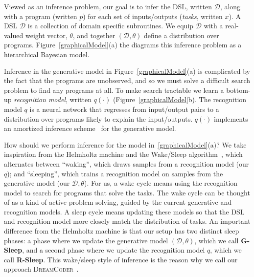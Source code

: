 \documentclass{article}
\newcommand{\system}{\textsc{DreamCoder}~}
\begin{document}
Viewed as an inference problem,
our goal is to infer the DSL, written $\mathcal{D}$,
along with a program (written $p$) for each set of inputs/outputs (\emph{tasks}, written $x$).
A DSL $\mathcal{D}$ is a collection of domain specific subroutines.
We equip $\mathcal{D}$ with a real-valued weight vector, $\theta$, and together
$(\mathcal{D},\theta)$ define a distribution over programs.
Figure~\ref{graphicalModel}(a) the diagrams this inference problem as a hierarchical Bayesian model.




Inference in the generative model in Figure~\ref{graphicalModel}(a) is
complicated by the fact that the programs are unobserved,
and so we must solve a difficult search problem to find any programs at all. To make
search tractable we learn a bottom-up \emph{recognition
  model}, written $q(\cdot )$
(Figure~\ref{graphicalModel}b).  The recognition model $q$ is a neural
network that regresses from input/output pairs to a distribution over
programs likely to explain the input/outputs. $q(\cdot )$ implements an amortized
inference
scheme~\cite{le2016inference} for the generative %
model.

How should we perform inference for the model
in~\ref{graphicalModel}(a)?
We take inspiration from the Helmholtz machine and the Wake/Sleep algorithm~\cite{hinton1995wake},
which alternates between ``waking'', which draws samples from a recognition model (our $q$);
and  ``sleeping'', which trains a recognition model on samples from the generative model (our $\mathcal{D},\theta$).
For us, a wake cycle means using the recognition model to search for programs that solve the tasks.
The wake cycle can be thought of as a kind of active problem solving,
guided by the current generative and recognition models.
A sleep cycle means  updating these models so that the DSL and  recognition model
more closely match the distribution of tasks.
An important difference from the Helmholtz machine
is that our setup has two distinct sleep phases: a phase where we update the generative model
$(\mathcal{D},\theta)$, which we call \textbf{G-Sleep},
and a second phase where we update the recognition model $q$,
which we call \textbf{R-Sleep}.
This wake/sleep style of inference is the reason why we call our approach \system.
\end{document}
